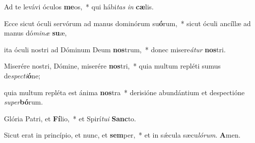 \item Ad te levávi óculos \textbf{me}os,~* qui hábi\textit{tas} \textit{in} \textbf{cæ}lis.

\item Ecce sicut óculi servórum ad manus dominórum su\textbf{ó}rum,~* sicut óculi ancíllæ ad manus dó\textit{mi}\textit{næ} \textbf{su}æ,

\item ita óculi nostri ad Dóminum Deum \textbf{nos}trum,~* donec misere\textit{á}\textit{tur} \textbf{nos}tri.

\item Miserére nostri, Dómine, miserére \textbf{nos}tri,~* quia multum repléti sumus de\textit{spec}\textit{ti}\textbf{ó}ne;

\item quia multum repléta est ánima \textbf{nos}tra~* derisióne abundántium et despectióne \textit{su}\textit{per}\textbf{bó}rum.

\item Glória Patri, et \textbf{Fí}lio,~* et Spirí\textit{tu}\textit{i} \textbf{Sanc}to.

\item Sicut erat in princípio, et nunc, et \textbf{sem}per,~* et in sǽcula sæcu\textit{ló}\textit{rum}. \textbf{A}men.